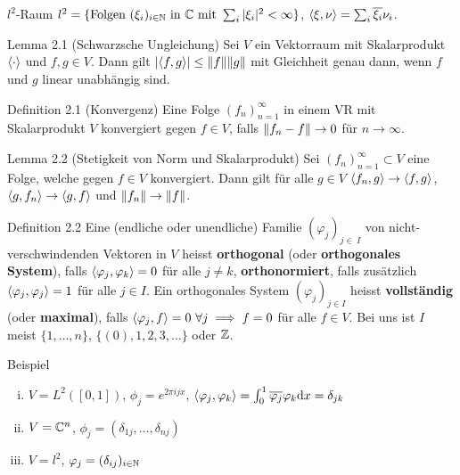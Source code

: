 \begin{namedtheorem}{$l^2$-Raum}
  $l^2=\{\text{Folgen } (\xi_i)_{i\in\mathbb{N}}\text{ in }\mathbb{C}\text{ mit }\sum_{i}|\xi_i|^2<\infty\}$, $\langle \xi,\nu \rangle=\sum_i\overline{\xi_i}\nu_i$.
\end{namedtheorem}

\begin{namedtheorem}{Lemma 2.1 (Schwarzsche Ungleichung)}
  Sei $V$ ein Vektorraum mit Skalarprodukt $\langle \cdot \rangle$ und $f,g\in V$. Dann gilt $|\langle f,g \rangle|\leq\lVert f\rVert\lVert g\rVert$ mit Gleichheit genau dann, wenn $f$ und $g$ linear unabhängig sind.
\end{namedtheorem}

\begin{namedtheorem}{Definition 2.1 (Konvergenz)}
  Eine Folge $(f_n)_{n=1}^{\infty}$ in einem VR mit Skalarprodukt $V$ konvergiert gegen $f\in V$, falls $\lVert f_n-f\rVert\rightarrow0$ für $n\rightarrow\infty$.
\end{namedtheorem}

\begin{namedtheorem}{Lemma 2.2 (Stetigkeit von Norm und Skalarprodukt)}
  Sei $(f_n)_{n=1}^{\infty}\subset V$ eine Folge, welche gegen $f\in V$ konvergiert. Dann gilt für alle $g\in V$ $\langle f_n,g \rangle\rightarrow\langle f,g \rangle$, $\langle g,f_n \rangle\rightarrow\langle g,f \rangle$ und $\lVert f_n\rVert\rightarrow\lVert f\rVert$. 
\end{namedtheorem}

\begin{namedtheorem}{Definition 2.2}
  Eine (endliche oder unendliche) Familie $(\varphi_j)_{j\in\ I}$ von nicht-verschwindenden Vektoren in $V$ heisst \textbf{orthogonal} (oder \textbf{orthogonales System}), falls $\langle \varphi_j,\varphi_k \rangle=0$ für alle $j\neq k$, \textbf{orthonormiert}, falls zusätzlich $\langle \varphi_j,\varphi_j \rangle=1$ für alle $j\in I$. Ein orthogonales System $(\varphi_j)_{j \in I}$ heisst \textbf{vollständig} (oder \textbf{maximal}), falls $\langle \varphi_j,f \rangle=0\ \forall j \implies f=0$ für alle $f\in V$. Bei uns ist $I$ meist $\{1,\ldots,n\}$, $\{(0),1,2,3,\ldots\}$ oder $\mathbb{Z}$.
\end{namedtheorem}

\begin{namedtheorem}{Beispiel}

  \begin{enumerate}[(i)]
    \item $V=L^2([0,1])$, $\phi_j=e^{2\pi ijx}$, $\langle \varphi_j,\varphi_k \rangle=\int_0^1\overline{\varphi_j}\varphi_k\mathrm{d}x = \delta_{jk}$
  \end{enumerate}
  {\setlength\multicolsep{4pt}%
  \begin{multicols}{2}
  \begin{enumerate}[(i)]
    \setcounter{enumi}{1}
    \item $V=\mathbb{C}^n$, $\phi_j=(\delta_{1j},\ldots,\delta_{nj})$
    \item $V=l^2$, $\varphi_j=(\delta_{ij})_{i\in\mathbb{N}}$
  \end{enumerate}
  \end{multicols}}
\end{namedtheorem}

